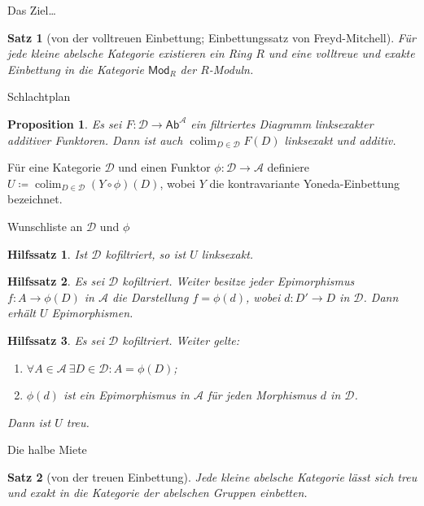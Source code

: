 \documentclass[usenames, dvipsnames]{beamer}
\newtheorem{proposition}{Proposition}
\newtheorem{hilfssatz}{Hilfssatz}
\newtheorem{satz}{Satz}
\newcommand\ccat\mathsf
\newcommand\cat\mathcal
\DeclareMathOperator{\colim}{colim}
\begin{document}
	\begin{frame}{Das Ziel\ldots}
		\begin{satz}[von der volltreuen Einbettung; Einbettungssatz von Freyd-Mitchell]
			Für jede kleine abelsche Kategorie existieren ein Ring $R$ und eine volltreue
			und exakte Einbettung in die Kategorie $\ccat{Mod}_R$ der $R$-Moduln.
		\end{satz}
	\end{frame}
	\begin{frame}{Schlachtplan}
		\begin{proposition}
			Es sei $F\colon\cat{D}\to\ccat{Ab}^{\cat{A}}$ ein filtriertes Diagramm
			linksexakter additiver Funktoren. Dann ist auch $\colim_{D\in\cat{D}} F(D)$
			linksexakt und additiv.
		\end{proposition}\pause
		\begin{definition}[Die Einbettung in $\ccat{Ab}$]
			Für eine Kategorie $\cat{D}$ und einen Funktor $\phi\colon\cat{D}\to\cat{A}$
			definiere $U\coloneqq\colim_{D\in\cat{D}} (Y\circ\phi)(D)$, wobei $Y$ die
			kontravariante Yoneda-Einbettung bezeichnet.
		\end{definition}
	\end{frame}
	\begin{frame}{Wunschliste an $\cat{D}$ und $\phi$}
		\begin{hilfssatz}
			Ist $\cat{D}$ kofiltriert, so ist $U$ linksexakt.
		\end{hilfssatz}\pause
		\begin{hilfssatz}
			Es sei $\cat{D}$ kofiltriert. Weiter besitze jeder Epimorphismus
			$f\colon A\to\phi(D)$ in $\cat{A}$ die Darstellung $f = \phi(d)$, wobei
			$d\colon D'\to D$ in $\cat{D}$. Dann erhält $U$ Epimorphismen.
		\end{hilfssatz}\pause
		\begin{hilfssatz}
			Es sei $\cat{D}$ kofiltriert. Weiter gelte:
			\begin{enumerate}
				\item $\forall A\in\cat{A}\ \exists D\in\cat{D}: A=\phi(D)$;
				\item $\phi(d)$ ist ein Epimorphismus in $\cat{A}$ für jeden Morphismus $d$ in $\cat{D}$.
			\end{enumerate}
			Dann ist $U$ treu.
		\end{hilfssatz}
	\end{frame}
	\begin{frame}{Die halbe Miete}
		\begin{satz}[von der treuen Einbettung]\label{abeb}
			Jede kleine abelsche Kategorie lässt sich treu und exakt in die Kategorie
			der abelschen Gruppen einbetten.
		\end{satz}
	\end{frame}
\end{document}
